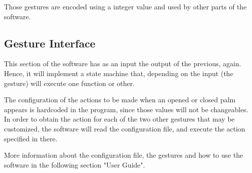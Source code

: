 Those gestures are encoded using a integer value and used by other parts of the software.


\subsection{Gesture Interface} 
This section of the software has as an input the output of the previous, again. Hence, it will implement a state machine that, depending on the input (the gesture) will execute one function or other. 

\begin{center}
\end{center}

The configuration of the actions to be made when an opened or closed palm appears is hardcoded in the program, since those values will not be changeables. In order to obtain the action for each of the two other gestures that may be customized, the software will read the configuration file, and execute the action specified in there. 

More information about the configuration file, the gestures and how to use the software in the following section "User Guide". 

\newpage